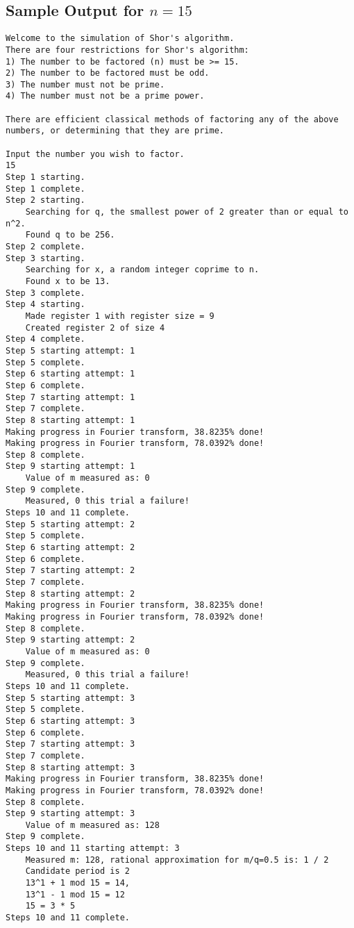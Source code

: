 \documentclass[]{article}
\begin{document}
\subsection{Sample Output for $n = 15$}
\begin{verbatim}
Welcome to the simulation of Shor's algorithm.
There are four restrictions for Shor's algorithm:
1) The number to be factored (n) must be >= 15.
2) The number to be factored must be odd.
3) The number must not be prime.
4) The number must not be a prime power.

There are efficient classical methods of factoring any of the above numbers, or determining that they are prime.

Input the number you wish to factor.
15
Step 1 starting.
Step 1 complete.
Step 2 starting.
	Searching for q, the smallest power of 2 greater than or equal to n^2.
	Found q to be 256.
Step 2 complete.
Step 3 starting.
	Searching for x, a random integer coprime to n.
	Found x to be 13.
Step 3 complete.
Step 4 starting.
	Made register 1 with register size = 9
	Created register 2 of size 4
Step 4 complete.
Step 5 starting attempt: 1
Step 5 complete.
Step 6 starting attempt: 1
Step 6 complete.
Step 7 starting attempt: 1
Step 7 complete.
Step 8 starting attempt: 1
Making progress in Fourier transform, 38.8235% done!
Making progress in Fourier transform, 78.0392% done!
Step 8 complete.
Step 9 starting attempt: 1
	Value of m measured as: 0
Step 9 complete.
	Measured, 0 this trial a failure!
Steps 10 and 11 complete.
Step 5 starting attempt: 2
Step 5 complete.
Step 6 starting attempt: 2
Step 6 complete.
Step 7 starting attempt: 2
Step 7 complete.
Step 8 starting attempt: 2
Making progress in Fourier transform, 38.8235% done!
Making progress in Fourier transform, 78.0392% done!
Step 8 complete.
Step 9 starting attempt: 2
	Value of m measured as: 0
Step 9 complete.
	Measured, 0 this trial a failure!
Steps 10 and 11 complete.
Step 5 starting attempt: 3
Step 5 complete.
Step 6 starting attempt: 3
Step 6 complete.
Step 7 starting attempt: 3
Step 7 complete.
Step 8 starting attempt: 3
Making progress in Fourier transform, 38.8235% done!
Making progress in Fourier transform, 78.0392% done!
Step 8 complete.
Step 9 starting attempt: 3
	Value of m measured as: 128
Step 9 complete.
Steps 10 and 11 starting attempt: 3
	Measured m: 128, rational approximation for m/q=0.5 is: 1 / 2
	Candidate period is 2
	13^1 + 1 mod 15 = 14,
	13^1 - 1 mod 15 = 12
	15 = 3 * 5
Steps 10 and 11 complete.
\end{verbatim}
\pagebreak
\end{document}
